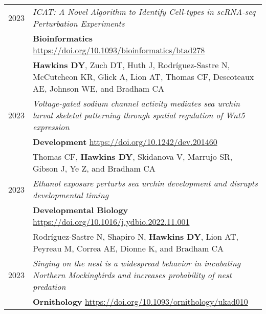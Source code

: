 \documentclass[a4paper,10pt]{report}
\begin{document}
\section{\color{linkcolour}{Publications}}
\begin{tabular}{rp{11cm}}
	\textsc{2023} & \emph{ICAT: A Novel Algorithm to Identify Cell-types in scRNA-seq Perturbation Experiments}                                                                   \\
	              & \small \textbf{Bioinformatics} \href{https://doi.org/10.1093/bioinformatics/btad278}{https://doi.org/10.1093/bioinformatics/btad278}                          \\
	              & \footnotesize \textbf{Hawkins DY}, Zuch DT, Huth J, Rodríguez-Sastre N, McCutcheon KR, Glick A, Lion AT, Thomas CF, Descoteaux AE, Johnson WE, and Bradham CA \\
	\textsc{2023} & \emph{Voltage-gated sodium channel activity mediates sea urchin larval skeletal patterning through spatial regulation of Wnt5 expression}                     \\
	              & \small \textbf{Development} \href{https://doi.org/10.1242/dev.201460}{https://doi.org/10.1242/dev.201460}                                                     \\
	              & \footnotesize Thomas CF, \textbf{Hawkins DY}, Skidanova V, Marrujo SR, Gibson J, Ye Z, and Bradham CA                                                         \\
	\textsc{2023} & \emph{Ethanol exposure perturbs sea urchin development and disrupts developmental timing}                                                                     \\
	              & \small \textbf{Developmental Biology} \href{https://doi.org/10.1016/j.ydbio.2022.11.001}{https://doi.org/10.1016/j.ydbio.2022.11.001}                         \\
	              & \footnotesize Rodríguez-Sastre N, Shapiro N, \textbf{Hawkins DY}, Lion AT, Peyreau M, Correa AE, Dionne K, and Bradham CA                                     \\
	\textsc{2023} & \emph{Singing on the nest is a widespread behavior in incubating Northern Mockingbirds and increases probability of nest predation}                           \\
	              & \small \textbf{Ornithology}  \href{https://doi.org/10.1093/ornithology/ukad010}{https://doi.org/10.1093/ornithology/ukad010}                                  \\

\end{tabular}
\end{document}
